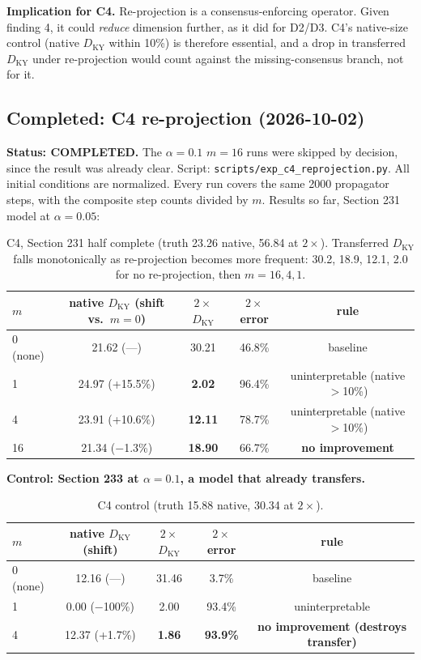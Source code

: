 \documentclass[11pt]{article}
\begin{document}
\textbf{Implication for C4.} Re-projection is a consensus-enforcing
operator. Given finding 4, it could \emph{reduce} dimension further, as
it did for D2/D3. C4's native-size control (native $D_{\mathrm{KY}}$
within 10\%) is therefore essential, and a drop in transferred
$D_{\mathrm{KY}}$ under re-projection would count against the
missing-consensus branch, not for it.

\subsection{Completed: C4 re-projection (2026-10-02)}
\label{sec:c4_partial}

\textbf{Status: COMPLETED.} The $\alpha{=}0.1$ $m{=}16$ runs were skipped by decision, since the result was already clear. Script: \texttt{scripts/exp\_c4\_reprojection.py}.
All initial conditions are normalized. Every run covers the same 2000
propagator steps, with the composite step counts divided by $m$. Results
so far, Section 231 model at $\alpha{=}0.05$:

\begin{table}[h]
\centering
\small
\begin{tabular}{lcccc}
\toprule
$m$ & native $D_{\mathrm{KY}}$ (shift vs.\ $m{=}0$) & $2\times$ $D_{\mathrm{KY}}$ & $2\times$ error & rule \\
\midrule
0 (none) & 21.62 (---) & 30.21 & 46.8\% & baseline \\
1 & 24.97 (+15.5\%) & \textbf{2.02} & 96.4\% & uninterpretable (native $>$10\%) \\
4 & 23.91 (+10.6\%) & \textbf{12.11} & 78.7\% & uninterpretable (native $>$10\%) \\
16 & 21.34 ($-$1.3\%) & \textbf{18.90} & 66.7\% & \textbf{no improvement} \\
\bottomrule
\end{tabular}
\caption{C4, Section 231 half complete (truth 23.26 native, 56.84 at
$2\times$). Transferred $D_{\mathrm{KY}}$ falls monotonically as
re-projection becomes more frequent: 30.2, 18.9, 12.1, 2.0 for no
re-projection, then $m{=}16, 4, 1$.}
\label{tab:c4_partial}
\end{table}

\textbf{Control: Section 233 at $\alpha{=}0.1$, a model that already transfers.}

\begin{table}[h]
\centering
\small
\begin{tabular}{lcccc}
\toprule
$m$ & native $D_{\mathrm{KY}}$ (shift) & $2\times$ $D_{\mathrm{KY}}$ & $2\times$ error & rule \\
\midrule
0 (none) & 12.16 (---) & 31.46 & 3.7\% & baseline \\
1 & 0.00 ($-$100\%) & 2.00 & 93.4\% & uninterpretable \\
4 & 12.37 (+1.7\%) & \textbf{1.86} & \textbf{93.9\%} & \textbf{no improvement (destroys transfer)} \\
\bottomrule
\end{tabular}
\caption{C4 control (truth 15.88 native, 30.34 at $2\times$).}
\label{tab:c4_control}
\end{table}
\end{document}
